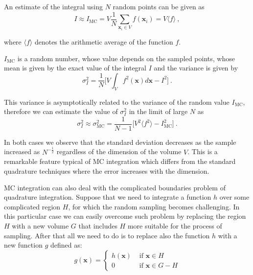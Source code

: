 \documentclass[../main/main.tex]{subfiles}
\begin{document}
An estimate of the integral using $N$ random points can be given as
\begin{equation}
	I \approx I_{\text{MC}} = V \frac{1}{N} \sum_{\textbf{x}_i \in V} f(\textbf{x}_i) = V \langle f \rangle \ ,
\end{equation}

where $\langle f \rangle$ denotes the arithmetic average of the function $f$.

$I_{\text{MC}}$ is a random number, whose value depends on the sampled points, whose mean 
is given by the exact value of the integral $I$ and the variance is given by
\begin{equation}
	\label{variance}
	\sigma^2_I = \frac{1}{N} \big[ V \int_{V}   f^2(\textbf{x}) d \textbf{x}  - I^2 \big] \ .
\end{equation}

This variance is asymptotically related to the variance of the random value $I_{\text{MC}}$, therefore
we can estimate the value of $\sigma^2_I$ in the limit of large $N$ as
\begin{equation}
	\label{sigma_MC}
	\sigma^2_I \approx \sigma^2_\text{MC}  = \frac{1}{N-1} \Big[ 
	V^2 \langle  f^2 \rangle 
	- I^2_{\text{MC}}\Big] \ .
\end{equation}

In both cases we observe that the standard deviation decreases as the sample increased 
as $N^{-\frac{1}{2}}$ regardless of the dimension of the volume $V$. This is a remarkable feature 
typical of MC integration which differs from the standard quadrature techniques where the error 
increases with the dimension.

MC integration can also deal with the complicated boundaries problem of quadrature integration.
Suppose that we need to integrate a function $h$ over some complicated region $H$, for which the 
random sampling becomes challenging. 
In this particular case we can easily overcome such problem by replacing the region $H$ with a new volume 
$G$ that includes $H$ more suitable for the process of sampling. After that all we need to do is to replace also 
the function $h$ with a new function $g$ defined as:
\begin{equation}
	g(\textbf{x}) = \begin{cases}
		h(\textbf{x}) &\text{ if $\textbf{x} \in H$} \\
		0 &\text{ if $\textbf{x} \in G - H$}
	\end{cases}
\end{equation}
\end{document}
